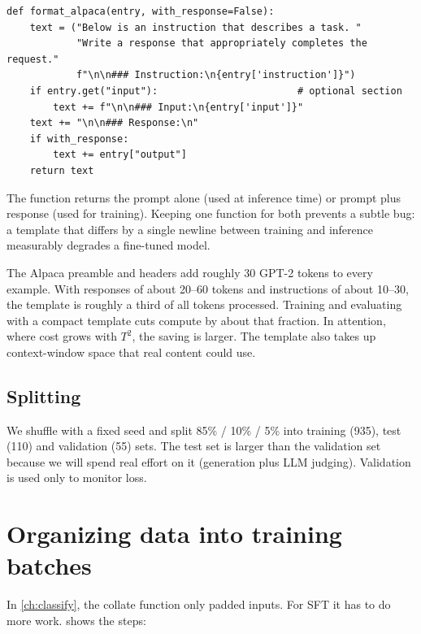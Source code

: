 \begin{lstlisting}[caption={Rendering a record with the Alpaca template (from \ident{llmsys/finetune.py}).},label={lst:instruct:alpaca}]
def format_alpaca(entry, with_response=False):
    text = ("Below is an instruction that describes a task. "
            "Write a response that appropriately completes the request."
            f"\n\n### Instruction:\n{entry['instruction']}")
    if entry.get("input"):                        # optional section
        text += f"\n\n### Input:\n{entry['input']}"
    text += "\n\n### Response:\n"
    if with_response:
        text += entry["output"]
    return text
\end{lstlisting}

The function returns the prompt alone (used at inference time) or prompt plus response
(used for training). Keeping one function for both prevents a subtle bug: a template
that differs by a single newline between training and inference measurably degrades a
fine-tuned model.

\begin{napkinmath}
The Alpaca preamble and headers add roughly 30 GPT-2 tokens to every example. With
responses of about 20--60 tokens and instructions of about 10--30, the template is
roughly a third of all tokens processed. Training and evaluating with a compact
template cuts compute by about that fraction. In attention, where cost grows with
$T^2$, the saving is larger. The template also takes up context-window space that real
content could use.
\end{napkinmath}

\subsection{Splitting}

We shuffle with a fixed seed and split 85\% / 10\% / 5\% into training (935),
test (110) and validation (55) sets. The test set is larger than the validation set
because we will spend real effort on it (generation plus LLM judging). Validation is
used only to monitor loss.

\section{Organizing data into training batches}\label{sec:instruct:batches}

In \cref{ch:classify}, the collate function only padded inputs. For SFT it has to do
more work.  shows the steps:

